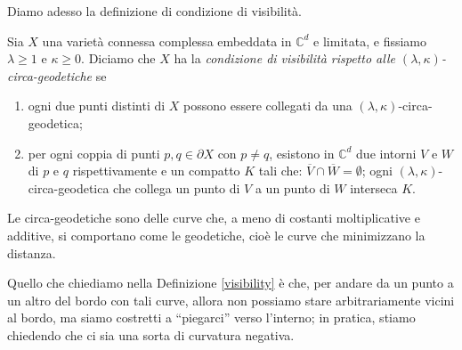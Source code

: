 Diamo adesso la definizione di condizione di visibilità.

\begin{defn} \label{visibility}
    Sia $X$ una varietà connessa complessa embeddata in $\mathbb{C}^d$ e limitata, e fissiamo $\lambda \ge 1$ e $\kappa \ge 0$. Diciamo che $X$ ha la \textit{condizione di visibilità rispetto alle $(\lambda,\kappa)$-circa-geodetiche} se
    \begin{enumerate}
        \item ogni due punti distinti di $X$ possono essere collegati da una $(\lambda,\kappa)$-circa-geodetica;
        \item per ogni coppia di punti $p,q\in\partial X$ con $p\not=q$, esistono in $\mathbb{C}^d$ due intorni $V$ e $W$ di $p$ e $q$ rispettivamente e un compatto $K$ tali che: $\overline{V}\cap\overline{W}=\emptyset$; ogni $(\lambda,\kappa)$-circa-geodetica che collega un punto di $V$ a un punto di $W$ interseca $K$.
    \end{enumerate}
\end{defn}

Le circa-geodetiche sono delle curve che, a meno di costanti moltiplicative e additive, si comportano come le geodetiche, cioè le curve che minimizzano la distanza.

Quello che chiediamo nella Definizione \ref{visibility} è che, per andare da un punto a un altro del bordo con tali curve, allora non possiamo stare arbitrariamente vicini al bordo, ma siamo costretti a ``piegarci'' verso l'interno; in pratica, stiamo chiedendo che ci sia una sorta di curvatura negativa.